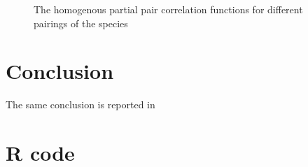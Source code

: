 \documentclass[12pt,a4paper,oneside,article]{memoir}
\begin{document}
\begin{figure}[htbp]
  \begin{adjustwidth}{-2in}{-2in}
	  \centering
  \end{adjustwidth}
  \caption{The homogenous partial pair correlation functions for different pairings of the species}
  \label{fig:ppcfi}
\end{figure}

\section{Conclusion}

The same conclusion is reported in \cite{perry}


\printbibliography
\clearpage
\appendix
\section*{R code}


\end{document}
